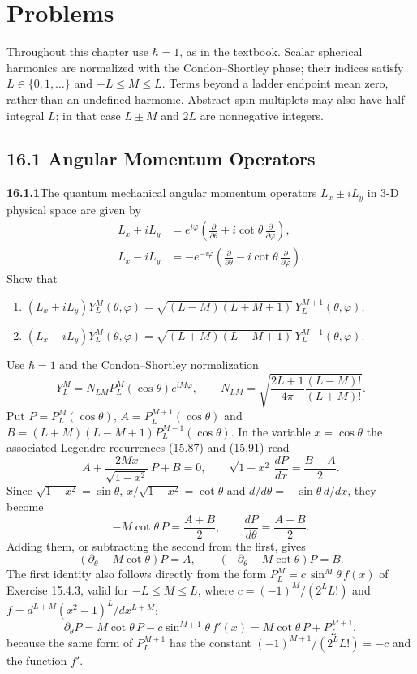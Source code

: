 
\section*{Problems}

Throughout this chapter use $\hbar=1$, as in the textbook. Scalar
spherical harmonics are normalized with the Condon--Shortley phase;
their indices satisfy $L\in\{0,1,\ldots\}$ and $-L\le M\le L$.
Terms beyond a ladder endpoint mean zero, rather than an undefined
harmonic. Abstract spin multiplets may also have half-integral $L$;
in that case $L\pm M$ and $2L$ are nonnegative integers.

\subsection*{16.1 Angular Momentum Operators}

\par\bigskip
\noindent\textbf{16.1.1}\quad The quantum mechanical angular momentum
operators $L_{x}\pm iL_{y}$ in 3-D physical space are given by
\begin{align*}
L_{x}+iL_{y}&=e^{i\varphi}
\left(\frac{\partial}{\partial\theta}
+i\cot\theta\,\frac{\partial}{\partial\varphi}\right),\\
L_{x}-iL_{y}&=-e^{-i\varphi}
\left(\frac{\partial}{\partial\theta}
-i\cot\theta\,\frac{\partial}{\partial\varphi}\right).
\end{align*}
Show that
\begin{enumerate}
\item[(a)] $(L_{x}+iL_{y})Y_{L}^{M}(\theta,\varphi)
=\sqrt{(L-M)(L+M+1)}\,Y_{L}^{M+1}(\theta,\varphi)$,
\item[(b)] $(L_{x}-iL_{y})Y_{L}^{M}(\theta,\varphi)
=\sqrt{(L+M)(L-M+1)}\,Y_{L}^{M-1}(\theta,\varphi)$.
\end{enumerate}
\solution
Use $\hbar=1$ and the Condon--Shortley normalization
\[
Y_L^M=N_{LM}P_L^M(\cos\theta)e^{iM\varphi},\qquad
N_{LM}=\sqrt{\frac{2L+1}{4\pi}\frac{(L-M)!}{(L+M)!}}.
\]
Put $P=P_L^M(\cos\theta)$,
$A=P_L^{M+1}(\cos\theta)$ and
$B=(L+M)(L-M+1)P_L^{M-1}(\cos\theta)$.
In the variable $x=\cos\theta$ the associated-Legendre recurrences
(15.87) and (15.91) read
\[
A+\frac{2Mx}{\sqrt{1-x^2}}\,P+B=0,\qquad
\sqrt{1-x^2}\,\frac{dP}{dx}=\frac{B-A}{2}.
\]
Since $\sqrt{1-x^2}=\sin\theta$, $x/\sqrt{1-x^2}=\cot\theta$ and
$d/d\theta=-\sin\theta\,d/dx$, they become
\[
-M\cot\theta\,P=\frac{A+B}{2},\qquad
\frac{dP}{d\theta}=\frac{A-B}{2}.
\]
Adding them, or subtracting the second from the first, gives
\[
(\partial_\theta-M\cot\theta)P=A,\qquad
(-\partial_\theta-M\cot\theta)P=B.
\]
The first identity also follows directly from the form
$P_L^M=c\,\sin^M\theta\,f(x)$ of Exercise 15.4.3, valid for
$-L\le M\le L$, where $c=(-1)^M/(2^LL!)$ and
$f=d^{L+M}(x^2-1)^L/dx^{L+M}$:
\[
\partial_\theta P
=M\cot\theta\,P-c\sin^{M+1}\theta\,f'(x)
=M\cot\theta\,P+P_L^{M+1},
\]
because the same form of $P_L^{M+1}$ has the constant
$(-1)^{M+1}/(2^LL!)=-c$ and the function $f'$.

